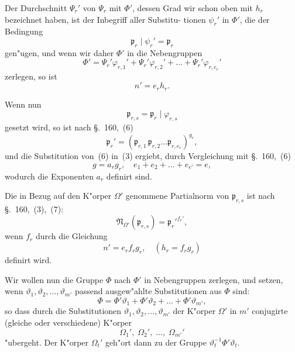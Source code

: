 \documentclass[12pt,a4paper]{article}
\theoremstyle{weber}
\begin{document}
Der Durchschnitt $\varPsi_r'$ von $\varPsi_r$ mit $\varPhi'$, dessen Grad wir schon
oben mit $h_r$ bezeichnet haben, ist der Inbegriff aller Substitu-
tionen $\psi_r'$ in $\varPhi'$, die der Bedingung
\[
\mathfrak{p}_r \mid \psi_r' = \mathfrak{p}_r
\]
gen"ugen, und wenn wir daher $\varPhi'$ in die Nebengruppen
\begin{equation}\label{eq:s163-4}
\varPhi' = \varPsi_r'\varphi_{r,1}' + \varPsi_r'\varphi_{r,2}' + \dots + \varPsi_r'\varphi_{r,e_r}'
\end{equation}
zerlegen, so ist
\begin{equation}\label{eq:s163-5}
n' = e_rh_r.
\end{equation}

Wenn nun
\[
\mathfrak{p}_{r,s} = \mathfrak{p}_r \mid \varphi_{r,s}
\]
gesetzt wird, so ist nach \S.~160,~(6)
\begin{equation}\label{eq:s163-6}
\mathfrak{p}_r' = (\mathfrak{p}_{r,1}\,\mathfrak{p}_{r,2}\dots\mathfrak{p}_{r,e_r})^{g_r},
\end{equation}
und die Substitution von~(6) in~(3) ergiebt, durch Vergleichung
mit \S.~160,~(6)
\begin{equation}\label{eq:s163-7}
g = a_rg_r, \quad e_1 + e_2 + \dots + e_{e'} = e,
\end{equation}
wodurch die Exponenten $a_r$ definirt sind.

Die in Bezug auf den K"orper $\varOmega'$ genommene Partialnorm
von $\mathfrak{p}_{r,s}$ ist nach \S.~160,~(3),~(7):
\begin{equation}\label{eq:s163-8}
\mathfrak{N}_{\varOmega'}(\mathfrak{p}_{r,s}) = \mathfrak{p}_r'^{f_r'},
\end{equation}
wenn $f_r$ durch die Gleichung
\begin{equation}\label{eq:s163-9}
n' = e_rf_rg_r, \quad (h_r = f_rg_r)
\end{equation}
definirt wird.

Wir wollen nun die Gruppe $\varPhi$ nach $\varPhi'$ in Nebengruppen
zerlegen, und setzen, wenn $\vartheta_1, \vartheta_2, \dots, \vartheta_{m'}$ passend ausgew"ahlte
Substitutionen aus $\varPhi$ sind:
\begin{equation}\label{eq:s163-10}
\varPhi = \varPhi'\vartheta_1 + \varPhi'\vartheta_2 + \dots + \varPhi'\vartheta_{m'},
\end{equation}
so dass durch die Substitutionen $\vartheta_1, \vartheta_2, \dots, \vartheta_{m'}$ der K"orper $\varOmega'$
in $m'$ conjugirte (gleiche oder verschiedene) K"orper
\[
\varOmega_1',\; \varOmega_2',\; \dots,\; \varOmega_{m'}'
\]
"ubergeht. Der K"orper $\varOmega_t'$ geh"ort dann zu der Gruppe $\vartheta_t^{-1}\varPhi'\vartheta_t$.
\end{document}
